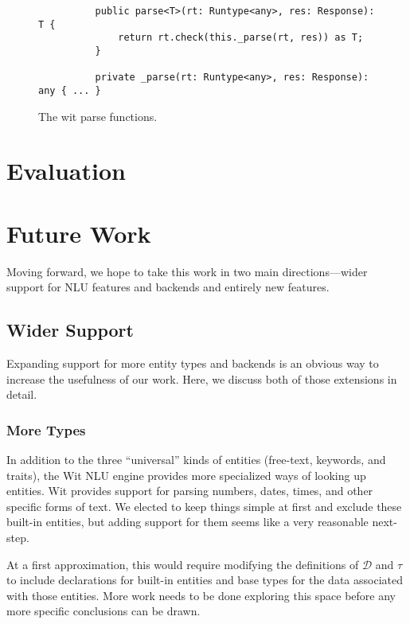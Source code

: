 \documentclass[twocolumn]{article}
\newcommand{\fcy}[1]{\mathcal{#1}}
\begin{document}
\begin{figure*}
\begin{verbatim}
          public parse<T>(rt: Runtype<any>, res: Response): T {
              return rt.check(this._parse(rt, res)) as T;
          }

          private _parse(rt: Runtype<any>, res: Response): any { ... }
\end{verbatim}
  \caption{The wit parse functions.}
  \label{fig:parse}
\end{figure*}

\section{Evaluation} \label{evaluation}

\section{Future Work} \label{future}
Moving forward, we hope to take this work in two main directions---wider support
for NLU features and backends and entirely new features.

\subsection{Wider Support}
Expanding support for more entity types and backends is an obvious way to
increase the usefulness of our work. Here, we discuss both of those extensions
in detail.

\subsubsection{More Types}
In addition to the three ``universal'' kinds of entities (free-text, keywords,
and traits), the Wit NLU engine provides more specialized ways of looking up
entities. Wit provides support for parsing numbers, dates, times, and other
specific forms of text. We elected to keep things simple at first and exclude
these built-in entities, but adding support for them seems like a very
reasonable next-step.

At a first approximation, this would require modifying the definitions of
$\fcy{D}$ and $\tau$ to include declarations for built-in entities and
base types for the data associated with those entities. More work needs to be
done exploring this space before any more specific conclusions can be drawn.
\end{document}
